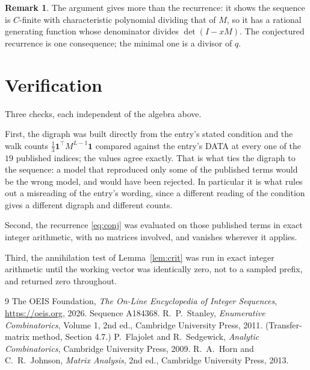 \documentclass[11pt,a4paper]{article}
\theoremstyle{plain}
\theoremstyle{definition}
\newtheorem{remark}[theorem]{Remark}
\begin{document}
\begin{remark}
The argument gives more than the recurrence: it shows the sequence is $C$-finite with
characteristic polynomial dividing that of $M$, so it has a rational generating function
whose denominator divides $\det(I-xM)$. The conjectured recurrence is one consequence; the
minimal one is a divisor of $q$.
\end{remark}

\section{Verification}

Three checks, each independent of the algebra above.

First, the digraph was built directly from the entry's stated condition and the walk counts
$\tfrac1{3}\mathbf{1}^{\!\top}M^{L-1}\mathbf{1}$ compared against the entry's DATA at
every one of the $19$ published indices; the values agree exactly. That is what ties
the digraph to the sequence: a model that reproduced only some of the published terms would
be the wrong model, and would have been rejected. In particular it is what rules out a
misreading of the entry's wording, since a different reading of the condition gives a
different digraph and different counts.

Second, the recurrence \eqref{eq:conj} was evaluated on those published terms in exact
integer arithmetic, with no matrices involved, and vanishes wherever it applies.

Third, the annihilation test of Lemma~\ref{lem:crit} was run in exact integer arithmetic
until the working vector was identically zero, not to a sampled prefix, and returned zero
throughout.

\begin{thebibliography}{9}
 The OEIS Foundation, \emph{The On-Line Encyclopedia of Integer
Sequences}, \url{https://oeis.org}, 2026. Sequence A184368.
 R.~P.~Stanley, \emph{Enumerative Combinatorics}, Volume 1, 2nd ed.,
Cambridge University Press, 2011. (Transfer-matrix method, Section 4.7.)
 P.~Flajolet and R.~Sedgewick, \emph{Analytic Combinatorics}, Cambridge
University Press, 2009.
 R.~A.~Horn and C.~R.~Johnson, \emph{Matrix Analysis}, 2nd ed., Cambridge
University Press, 2013.
\end{thebibliography}
\end{document}
